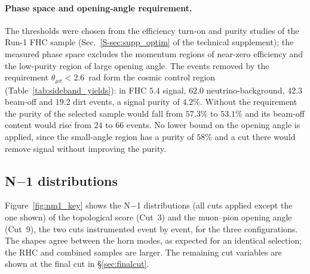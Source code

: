 \documentclass[11pt,a4paper]{article}
\newcommand{\suppref}[2]{#1~\ref{S-#2} of the technical supplement}
\begin{document}
\paragraph{Phase space and opening-angle requirement.}
The thresholds were chosen from the efficiency turn-on and purity studies of the Run-1 FHC sample
(\suppref{Sec.}{sec:supp_optim}); the measured phase space excludes the momentum regions of
near-zero efficiency and the low-purity region of large opening angle. The events removed by the
requirement $\theta_{\mu\pi}<2.6$~rad form the cosmic control region
(Table~\ref{tab:sideband_yields}): in FHC $5.4$ signal, $62.0$ neutrino-background, $42.3$
beam-off and $19.2$ dirt events, a signal purity of $4.2\%$. Without the requirement the purity of
the selected sample would fall from $57.3\%$ to $53.1\%$ and its beam-off content would rise from
$24$ to $66$ events. No lower bound on the opening angle is applied, since the small-angle region
has a purity of $58\%$ and a cut there would remove signal without improving the purity.

\subsection{N$-$1 distributions}

Figure~\ref{fig:nm1_key} shows the N$-$1 distributions (all cuts applied except the one shown) of
the topological score (Cut~3) and the muon--pion opening angle (Cut~9), the two cuts instrumented
event by event, for the three configurations. The shapes agree between the horn modes, as expected
for an identical selection; the RHC and combined samples are larger. The remaining cut variables
are shown at the final cut in \S\ref{sec:finalcut}.
\end{document}
